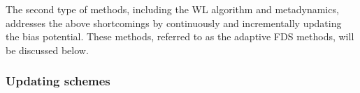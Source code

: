 \documentclass[reprint, superscriptaddress, floatfix]{revtex4-1}
\begin{document}
The second type of methods,
including the WL algorithm and metadynamics,
addresses the above shortcomings
by continuously and incrementally updating the bias potential.
%
These methods, referred to as the adaptive FDS methods,
will be discussed below.


\subsubsection{Updating schemes}
\end{document}
